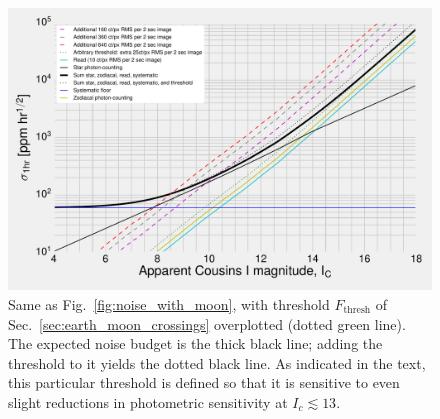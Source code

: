 \begin{figure}[!th] %
	\centering
	\includegraphics{figures/precision_threshold}
	\caption{Same as Fig.~\protect\ref{fig:noise_with_moon}, with threshold 
	$F_\mathrm{thresh}$ of Sec.~\protect\ref{sec:earth_moon_crossings} 
	overplotted (dotted green line). The expected noise budget is the thick 
	black line; adding the threshold to it yields the dotted black line. As 
	indicated in the text, this particular threshold is defined so that it is 
	sensitive to even slight reductions in photometric sensitivity at 
	$I_c\lesssim 13$.}
	\label{fig:precision_threshold}
\end{figure}
\newpage
